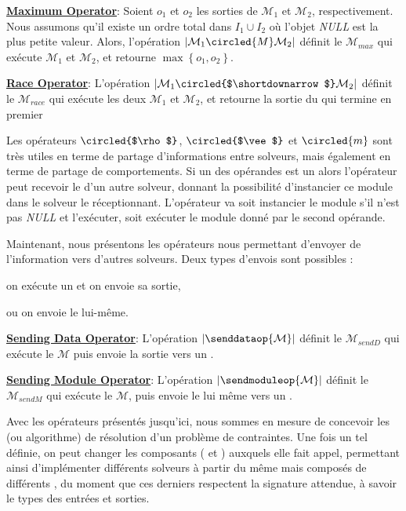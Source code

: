 \underline{\bf Maximum Operator}: Soient $o_1$ et $o_2$ les sorties de $\mathcal{M}_1$ et $\mathcal{M}_2$, respectivement. Nous assumons qu'il existe un ordre total dans $I_1 \cup I_2$ où l'objet \emph{NULL} est la plus petite valeur. Alors, l'opération $\left|\mathcal{M}_1\circled{M}\mathcal{M}_2\right|$ définit le \cm{} $\mathcal{M}_{max}$ qui exécute $\mathcal{M}_1$ et $\mathcal{M}_2$, et retourne $\max\left\{o_1,o_2\right\}$.

\underline{\bf Race Operator}: L'opération $\left|\mathcal{M}_1\circled{$\shortdownarrow$}\mathcal{M}_2\right|$ définit le \cm{} $\mathcal{M}_{race}$ qui exécute les deux \ms{} $\mathcal{M}_1$ et $\mathcal{M}_2$, et retourne la sortie du \m{} qui termine en premier

Les opérateurs $\circled{$\rho$}$, $\circled{$\vee$}$ et $\circled{m}$ sont très  utiles en  terme de  partage d'informations entre   solveurs, mais également en terme de partage de comportements. Si un  des opérandes est un \opch{} alors l'opérateur peut recevoir le \om{} d'un autre solveur, donnant la possibilité d'instancier ce module dans le solveur le réceptionnant. L'opérateur va soit instancier le module s'il  n'est pas {\it NULL} et l'exécuter, soit exécuter le module donné par le second opérande.

Maintenant, nous présentons les opérateurs nous permettant d'envoyer de l'information vers d'autres solveurs. Deux types d'envois sont possibles :
\begin{inparaenum}[i)]
	\item on exécute un \m{} et on envoie sa sortie,
	\item ou on envoie le \m{} lui-même.
\end{inparaenum}

\underline{\bf Sending Data Operator}: L'opération $\left|\senddataop{\mathcal{M}}\right|$ définit le \cm{} $\mathcal{M}_{sendD}$ qui exécute le \m{} $\mathcal{M}$ puis envoie la sortie vers un \opch.

\underline{\bf Sending Module Operator}: L'opération $\left|\sendmoduleop{\mathcal{M}}\right|$ définit le \cm{} $\mathcal{M}_{sendM}$ qui exécute le \m{} $\mathcal{M}$, puis envoie le \m{} lui même  vers un \opch.

Avec  les opérateurs  présentés jusqu'ici, nous sommes  en mesure  de concevoir les \ass{} (ou algorithme) de résolution d'un problème de contraintes. Une fois un tel \as{} définie, on peut changer les composants (\oms{} et \opchs) auxquels elle fait appel, permettant ainsi d'implémenter différents solveurs à partir du même \as{} mais composés de différents \ms, du moment que ces derniers respectent la signature attendue, à savoir le types des entrées et sorties.

